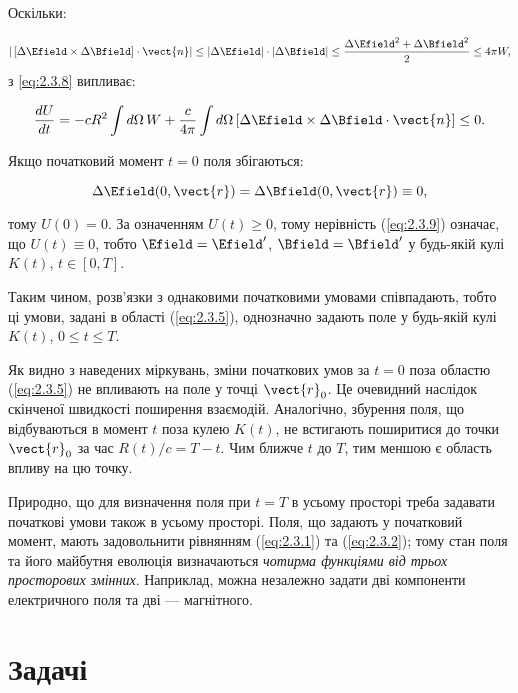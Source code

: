 Оскільки:

\begin{equation*}
| \left[ \Delta \Efield \times \Delta \Bfield \right]  \cdot \vect{n} | \leq | \Delta \Efield | \cdot | \Delta \Bfield | \leq \frac{\Delta \Efield^2 +
\Delta \Bfield^2}{2} \leq 4\pi W,
\end{equation*}
з \eqref{eq:2.3.8} випливає:

\begin{equation}\label{eq:2.3.9}
\frac{dU}{dt} = -c R^2 \int d\Omega \, W + \frac{c}{4\pi} \int d\Omega \, [\Delta \Efield \times \Delta \Bfield \cdot \vect{n}] \leq 0.
\end{equation}

Якщо початковий момент \( t = 0 \) поля збігаються:

\begin{equation*}
\Delta \Efield(0, \vect{r}) = \Delta \Bfield(0, \vect{r}) \equiv 0,
\end{equation*}

тому \( U(0) = 0 \). За означенням \( U(t) \geq 0 \), тому нерівність (\ref{eq:2.3.9}) означає, що \( U(t) \equiv 0 \), тобто \( \Efield = \Efield'
\), \( \Bfield = \Bfield' \) у будь-якій кулі \( K(t) \), \( t \in [0, T] \).

Таким чином, розв’язки з однаковими початковими умовами співпадають, тобто ці умови, задані в області (\ref{eq:2.3.5}), однозначно задають поле у
будь-якій кулі \( K(t) \), \( 0 \leq t \leq T \).

Як видно з наведених міркувань, зміни початкових умов за \( t = 0 \) поза областю (\ref{eq:2.3.5}) не впливають на поле у точці \( \vect{r}_0 \). Це
очевидний наслідок скінченої швидкості поширення взаємодій. Аналогічно, збурення поля, що відбуваються в момент \( t \) поза кулею \( K(t) \), не
встигають поширитися до точки \( \vect{r}_0 \) за час \( R(t)/c = T - t \). Чим ближче \( t \) до \( T \), тим меншою є область впливу на цю точку.

Природно, що для визначення поля при \( t = T \) в усьому просторі треба задавати початкові умови також в усьому просторі. Поля, що задають у початковий
момент, мають задовольнити рівнянням (\ref{eq:2.3.1}) та (\ref{eq:2.3.2}); тому стан поля та його майбутня еволюція визначаються \emph{чотирма функціями
від трьох просторових змінних}. Наприклад, можна незалежно задати дві компоненти електричного поля та дві --- магнітного.

\section*{Задачі}

